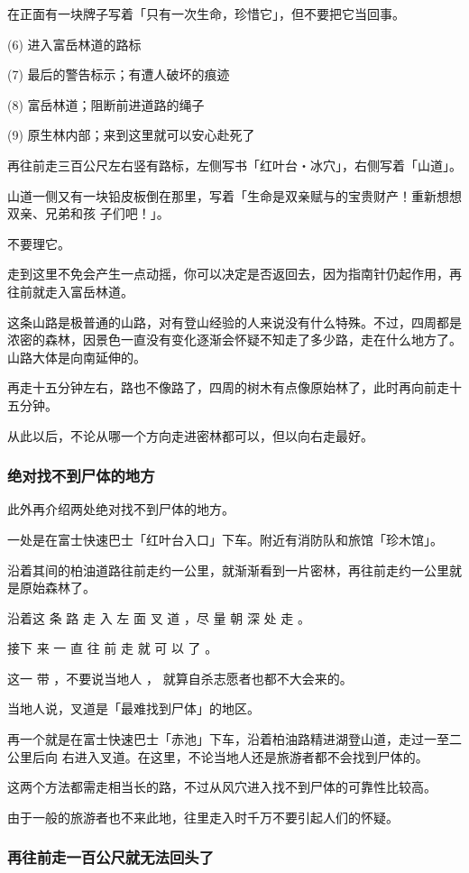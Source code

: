\documentclass[UTF8]{ctexart}
\begin{document}
在正面有一块牌子写着「只有一次生命，珍惜它」，但不要把它当回事。

(6) 进入富岳林道的路标

(7) 最后的警告标示；有遭人破坏的痕迹

(8) 富岳林道；阻断前进道路的绳子

(9) 原生林内部；来到这里就可以安心赴死了

再往前走三百公尺左右竖有路标，左侧写书「红叶台‧冰穴」，右侧写着「山道」。

山道一侧又有一块铅皮板倒在那里，写着「生命是双亲赋与的宝贵财产！重新想想双亲、兄弟和孩
子们吧！」。

不要理它。

走到这里不免会产生一点动摇，你可以决定是否返回去，因为指南针仍起作用，再往前就走入富岳林道。

这条山路是极普通的山路，对有登山经验的人来说没有什么特殊。不过，四周都是浓密的森林，因景色一直没有变化逐渐会怀疑不知走了多少路，走在什么地方了。山路大体是向南延伸的。

再走十五分钟左右，路也不像路了，四周的树木有点像原始林了，此时再向前走十五分钟。

从此以后，不论从哪一个方向走进密林都可以，但以向右走最好。

\subsubsection*{绝对找不到尸体的地方}

此外再介绍两处绝对找不到尸体的地方。

一处是在富士快速巴士「红叶台入口」下车。附近有消防队和旅馆「珍木馆」。

沿着其间的柏油道路往前走约一公里，就渐渐看到一片密林，再往前走约一公里就是原始森林了。

沿着这 条 路 走 入 左 面 叉 道 ，尽 量 朝 深 处 走 。

接下 来 一 直 往 前 走 就 可 以 了 。

这一 带 ，不要说当地人 ， 就算自杀志愿者也都不大会来的。

当地人说，叉道是「最难找到尸体」的地区。

再一个就是在富士快速巴士「赤池」下车，沿着柏油路精进湖登山道，走过一至二公里后向
右进入叉道。在这里，不论当地人还是旅游者都不会找到尸体的。

这两个方法都需走相当长的路，不过从风穴进入找不到尸体的可靠性比较高。

由于一般的旅游者也不来此地，往里走入时千万不要引起人们的怀疑。

\subsubsection*{再往前走一百公尺就无法回头了}
\end{document}
